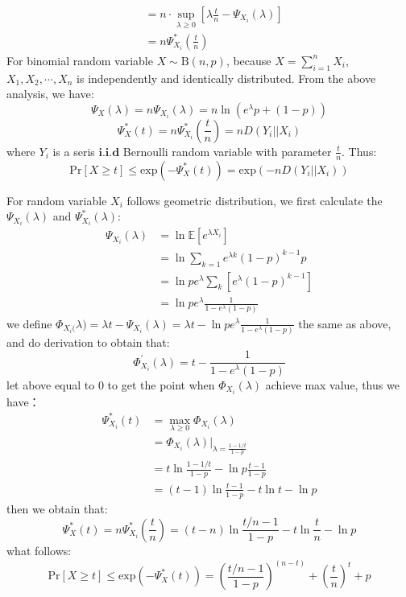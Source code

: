 \documentclass[12pt]{article}
\newenvironment{solution}[2][Solution]{\begin{trivlist}
\item[\hskip \labelsep {\bfseries #1}\hskip \labelsep {\bfseries #2.}]}{\end{trivlist}}
\begin{document}
\begin{solution}{2}
\begin{itemize}
\begin{align*}
            & = n \cdot \sup_{\lambda \ge 0}[\lambda \frac{t}{n} - \Psi_{X_i}(\lambda)] \\
            & = n\Psi_{X_i}^*(\frac{t}{n})
        \end{align*}
        For binomial random variable $X \sim \mathrm{B}(n,p)$, because $X = \sum_{i=1}^nX_i$, $X_1,X_2,\cdots,X_n$ is independently and identically distributed.
        From the above analysis, we have:
        \[\Psi_X(\lambda)= n\Psi_{X_i}(\lambda) = n \ln(e^\lambda p+(1-p))\]
        \[\Psi_X^*(t) =  n\Psi_{X_i}^*(\frac{t}{n}) = nD(Y_i||X_i)\]
        where $Y_i$ is a seris $\mathbf{i.i.d}$ Bernoulli random variable with parameter $\frac{t}{n}$. Thus:
        \[\mathrm{Pr}[X \ge t] \le \mathrm{exp}(-\Psi_X^*(t)) = \mathrm{exp}(-nD(Y_i||X_i))\]
        
        For random variable $X_i$ follows geometric distribution, we first calculate the $\Psi_{X_i}(\lambda)$ and $\Psi_{X_i}^*(\lambda)$:
        \begin{align*}
            \Psi_{X_i}(\lambda) & = \ln \mathbb{E}[e^{\lambda X_i}] \\
            & = \ln \sum_{k=1}e^{\lambda k}(1-p)^{k-1}p \\
            & = \ln pe^\lambda\sum_k[e^\lambda(1-p)^{k-1}] \\
            & = \ln pe^\lambda\frac{1}{1-e^\lambda(1-p)}
        \end{align*}
        we define $\Phi_{X_i(}\lambda) = \lambda t - \Psi_{X_i}(\lambda) = \lambda t - \ln pe^\lambda\frac{1}{1-e^\lambda(1-p)}$ the same as above, and do derivation to obtain that:
        \[\Phi_{X_i}^{\prime}(\lambda) = t - \frac{1}{1-e^\lambda(1-p)}\]
        let above equal to 0 to get the point when $\Phi_{X_i}(\lambda)$ achieve max value, thus we have：
        \begin{align*}
            \Psi_{X_i}^*(t) & = \max_{\lambda \ge 0}\Phi_{X_i}(\lambda) \\
            & = \Phi_{X_i}(\lambda)|_{\lambda = \frac{1-1/t}{1-p}} \\
            & = t \ln \frac{1-1/t}{1-p} - \ln p\frac{t-1}{1-p} \\
            & = (t-1)\ln\frac{t-1}{1-p} - t\ln t -\ln p
        \end{align*}
        then we obtain that:
        \[\Psi_{X}^*(t) = n\Psi_{X_i}^*(\frac{t}{n})=(t-n)\ln \frac{t/n-1}{1-p}-t\ln\frac{t}{n}-\ln p\]
        what follows:
        \[\mathrm{Pr}[X \ge t] \le \mathrm{exp}(-\Psi_X^*(t)) = (\frac{t/n-1}{1-p})^{(n-t)}+(\frac{t}{n})^t+p\]
    \end{itemize}
\end{solution}
\end{document}
